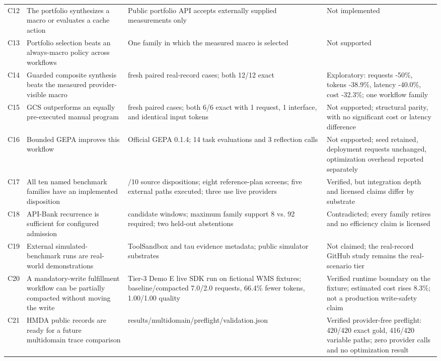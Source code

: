 \begin{tabularx}{\linewidth}{@{}l >{\raggedright\arraybackslash}X >{\raggedright\arraybackslash}X >{\raggedright\arraybackslash}X@{}}
C12 & The portfolio synthesizes a macro or evaluates a cache action & Public portfolio API accepts externally supplied measurements only & Not implemented \\
C13 & Portfolio selection beats an always-macro policy across workflows & One family in which the measured macro is selected & Not supported \\
C14 & Guarded composite synthesis beats the measured provider-visible macro & 12 fresh paired real-record cases; both 12/12 exact & Exploratory: requests -50\%, tokens -38.9\%, latency -40.0\%, cost -32.3\%; one workflow family \\
C15 & GCS outperforms an equally pre-executed manual program & 6 fresh paired cases; both 6/6 exact with 1 request, 1 interface, and identical input tokens & Not supported; structural parity, with no significant cost or latency difference \\
C16 & Bounded GEPA improves this workflow & Official GEPA 0.1.4; 14 task evaluations and 3 reflection calls & Not supported; seed retained, deployment requests unchanged, optimization overhead reported separately \\
C17 & All ten named benchmark families have an implemented disposition & 10/10 source dispositions; eight reference-plan screens; five external paths executed; three use live providers & Verified, but integration depth and licensed claims differ by substrate \\
C18 & API-Bank recurrence is sufficient for configured admission & 48 candidate windows; maximum family support 8 vs. 92 required; two held-out abstentions & Contradicted; every family retires and no efficiency claim is licensed \\
C19 & External simulated-benchmark runs are real-world demonstrations & ToolSandbox and tau evidence metadata; public simulator substrates & Not claimed; the real-record GitHub study remains the real-scenario tier \\
C20 & A mandatory-write fulfillment workflow can be partially compacted without moving the write & Tier-3 Demo E live SDK run on fictional WMS fixtures; baseline/compacted 7.0/2.0 requests, 66.4\% fewer tokens, 1.00/1.00 quality & Verified runtime boundary on the fixture; estimated cost rises 8.3\%; not a production write-safety claim \\
C21 & HMDA public records are ready for a future multidomain trace comparison & results/\allowbreak{}multidomain/\allowbreak{}preflight/\allowbreak{}validation.\allowbreak{}json & Verified provider-free preflight: 420/420 exact gold, 416/420 variable paths; zero provider calls and no optimization result \\

\end{tabularx}
